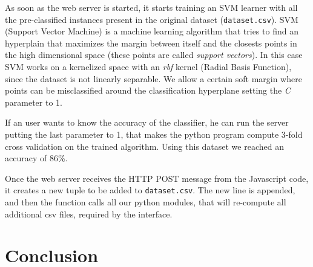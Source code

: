 \documentclass[journal]{vgtc}                %
\begin{document}
As soon as the web server is started, it starts training an SVM learner with all the pre-classified instances present in the original dataset (\texttt{dataset.csv}).
SVM (Support Vector Machine) \cite{Boser:1992:TAO:130385.130401} is a machine learning algorithm that tries to find an hyperplain that maximizes the margin between itself and the closests points in the high dimensional space (these points are called \textit{support vectors}). In this case
SVM works on a kernelized space with an \textit{rbf} kernel (Radial Basis Function), since the dataset is not linearly separable.
We allow a certain soft margin where points can be misclassified around the classification hyperplane setting the \textit{C} parameter to 1.

If an user wants to know the accuracy of the classifier, he can run the server putting the last parameter to 1, that makes the python program compute 3-fold cross validation on the trained algorithm. Using this dataset we reached an accuracy of 86\%.

Once the web server receives the HTTP POST message from the Javascript code, it creates a new tuple to be added to \texttt{dataset.csv}. The new line is appended, and then the function calls all our python modules, that will re-compute all additional csv files, required by the interface.

\section{Conclusion}






\end{document}
